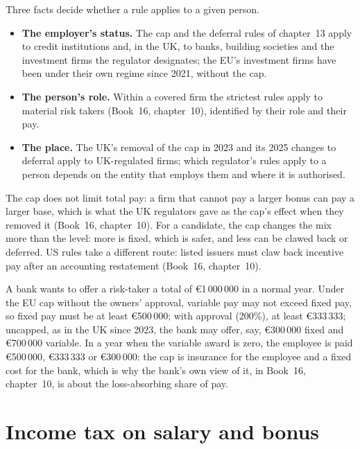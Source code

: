 Three facts decide whether a rule applies to a given person.
\begin{itemize}
\item \textbf{The employer's status.} The cap and the deferral rules of chapter~13 apply to credit institutions and, in
the UK, to banks, building societies and the investment firms the regulator designates; the EU's investment firms have
been under their own regime since 2021, without the cap.
\item \textbf{The person's role.} Within a covered firm the strictest rules apply to material risk takers (Book~16,
chapter~10), identified by their role and their pay.
\item \textbf{The place.} The UK's removal of the cap in 2023 and its 2025 changes to deferral apply to UK-regulated firms;
which regulator's rules apply to a person depends on the entity that employs them and where it is authorised.
\end{itemize}
The cap does not limit total pay: a firm that cannot pay a larger bonus can pay a larger base, which is what the UK
regulators gave as the cap's effect when they removed it (Book~16, chapter~10). For a candidate, the cap changes the mix
more than the level: more is fixed, which is safer, and less can be clawed back or deferred. US rules take a different
route: listed issuers must claw back incentive pay after an accounting restatement (Book~16, chapter~10).

\begin{example}\label{ex:in:pay-regulation-and-tax-by-location:mix}
A bank wants to offer a risk-taker a total of \euro1\,000\,000 in a normal year. Under the EU cap without the owners'
approval, variable pay may not exceed fixed pay, so fixed pay must be at least \euro500\,000; with approval (200\%), at
least \euro333\,333; uncapped, as in the UK since 2023, the bank may offer, say, \euro300\,000 fixed and \euro700\,000
variable. In a year when the variable award is zero, the employee is paid \euro500\,000, \euro333\,333 or \euro300\,000:
the cap is insurance for the employee and a fixed cost for the bank, which is why the bank's own view of it, in Book~16,
chapter~10, is about the loss-absorbing share of pay.
\end{example}

\section{Income tax on salary and bonus}

